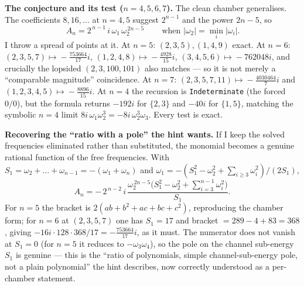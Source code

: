 \documentclass[11pt]{article}
\begin{document}
\medskip
\noindent\textbf{The conjecture and its test ($n=4,5,6,7$).}
The clean chamber generalises. The coefficients $8,16,\dots$ at $n=4,5$ suggest $2^{n-1}$ and
the power $2n-5$, so
\[
\boxed{\,A_n=2^{\,n-1}\,i\,\omega_1\,\omega_2^{\,2n-5}\,}\qquad\text{when }|\omega_2|=\min_i|\omega_i| .
\]
I throw a spread of points at it. At $n=5$: $(2,3,5),(1,4,9)$ exact. At $n=6$:
$(2,3,5,7)\!\mapsto\!-\tfrac{753664}{17}i$, $(1,2,4,8)\!\mapsto\!-\tfrac{4928}{15}i$,
$(3,4,5,6)\!\mapsto\!-762048i$, and crucially the lopsided $(2,3,100,101)$ also matches ---
so it is not merely a ``comparable magnitude'' coincidence. At $n=7$:
$(2,3,5,7,11)\!\mapsto\!-\tfrac{4030464}{7}i$ and $(1,2,3,4,5)\!\mapsto\!-\tfrac{8896}{15}i$.
At $n=4$ the recursion is \texttt{Indeterminate} (the forced $0/0$), but the formula returns
$-192i$ for $\{2,3\}$ and $-40i$ for $\{1,5\}$, matching the symbolic $n=4$ limit
$8i\,\omega_1\omega_2^3=-8i\,\omega_2^3\omega_3$. Every test is exact.

\medskip
\noindent\textbf{Recovering the ``ratio with a pole'' the hint wants.}
If I keep the solved frequencies eliminated rather than substituted, the monomial becomes a
genuine rational function of the free frequencies. With $S_1=\omega_2+\dots+\omega_{n-1}=
-(\omega_1+\omega_n)$ and
$\omega_1=-(S_1^2-\omega_2^2+\sum_{i\ge3}\omega_i^2)/(2S_1)$,
\[
A_n=-\,2^{\,n-2}\,i\,
\frac{\omega_2^{\,2n-5}\bigl(S_1^2-\omega_2^2+\sum_{i=3}^{n-1}\omega_i^2\bigr)}{S_1}.
\]
For $n=5$ the bracket is $2(ab+b^2+ac+bc+c^2)$, reproducing the chamber form; for $n=6$ at
$(2,3,5,7)$ one has $S_1=17$ and bracket $=289-4+83=368$, giving $-16i\cdot128\cdot368/17=
-\tfrac{753664}{17}i$, as it must. The numerator does not vanish at $S_1=0$ (for $n=5$ it
reduces to $-\omega_3\omega_4$), so the pole on the channel sub-energy $S_1$ is genuine ---
this is the ``ratio of polynomials, simple channel-sub-energy pole, not a plain polynomial''
the hint describes, now correctly understood as a per-chamber statement.
\end{document}
